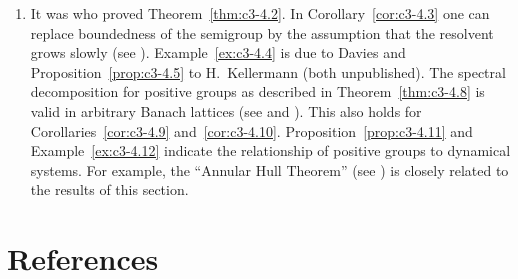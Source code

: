 \begin{enumerate}[label=\emph{Section \arabic*:}, wide, itemsep=1ex]
\item 
It was \textcite{derndinger:1980} who proved Theorem~\ref{thm:c3-4.2}. 
In Corollary~\ref{cor:c3-4.3} one can replace boundedness of the semigroup by the assumption that the resolvent grows slowly (see \textcite{greiner:1982}). 
Example~\ref{ex:c3-4.4} is due to Davies and Proposition~\ref{prop:c3-4.5} to H.~Kellermann (both unpublished). 
The spectral decomposition for positive groups as described in Theorem~\ref{thm:c3-4.8} is valid in arbitrary Banach lattices (see \textcite{arendt:1982} and \textcite{greiner:1984c}). 
This also holds for Corollaries~\ref{cor:c3-4.9} and~\ref{cor:c3-4.10}. 
Proposition~\ref{prop:c3-4.11} and Example~\ref{ex:c3-4.12} indicate the relationship of positive groups to dynamical systems. 
For example, the \enquote{Annular Hull Theorem} (see \textcite{chiconeswanson:1981}) is closely related to the results of this section.
\end{enumerate}
\section*{References}
{\RaggedRight
  \printbibliography[heading=none]
 }